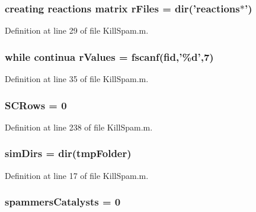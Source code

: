 \hypertarget{a00029_ad75735665492cabd747370126464fddf}{
\subsubsection[{r\+Files}]{\setlength{\rightskip}{0pt plus 5cm}creating {\bf reactions} matrix r\+Files = {\bf dir}('{\bf reactions}$\ast$')}}\label{a00029_ad75735665492cabd747370126464fddf}


Definition at line 29 of file Kill\+Spam.\+m.

\hypertarget{a00029_a436a6968124e560649654a4abbd9dac6}{
\subsubsection[{r\+Values}]{\setlength{\rightskip}{0pt plus 5cm}while {\bf continua} r\+Values = {\bf fscanf}({\bf fid},'\%d',7)}}\label{a00029_a436a6968124e560649654a4abbd9dac6}


Definition at line 35 of file Kill\+Spam.\+m.

\hypertarget{a00029_a4c9731061d3ea74c9ad35793b15491ab}{
\subsubsection[{S\+C\+Rows}]{\setlength{\rightskip}{0pt plus 5cm}S\+C\+Rows = 0}}\label{a00029_a4c9731061d3ea74c9ad35793b15491ab}


Definition at line 238 of file Kill\+Spam.\+m.

\hypertarget{a00029_aae5035eb84b89176ed5b06e136325eff}{
\subsubsection[{sim\+Dirs}]{\setlength{\rightskip}{0pt plus 5cm}sim\+Dirs = {\bf dir}({\bf tmp\+Folder})}}\label{a00029_aae5035eb84b89176ed5b06e136325eff}


Definition at line 17 of file Kill\+Spam.\+m.

\hypertarget{a00029_aac2cfcb79655911b15197407f3e8c51c}{
\subsubsection[{spammers\+Catalysts}]{\setlength{\rightskip}{0pt plus 5cm}spammers\+Catalysts = 0}}\label{a00029_aac2cfcb79655911b15197407f3e8c51c}


